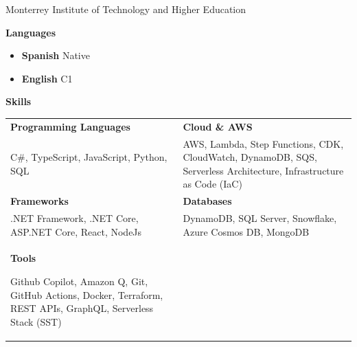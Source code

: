 \documentclass[11pt]{article}
\begin{document}
Monterrey Institute of Technology and Higher Education

\begin{center}
    \textbf{Languages}
\end{center}
\begin{itemize}[noitemsep, topsep=0pt, partopsep=0pt, parsep=0pt]
    \item \textbf{Spanish} Native
    \item \textbf{English} C1
\end{itemize}

\begin{center}
    \textbf{Skills}
\end{center}

\begin{tabular}{p{} p{}}

\textbf{Programming Languages} &
\textbf{Cloud \& AWS} \\

C\#, TypeScript, JavaScript, Python, SQL &
AWS, Lambda, Step Functions, CDK, CloudWatch, DynamoDB, SQS, Serverless Architecture, Infrastructure as Code (IaC) \\

\textbf{Frameworks} &
\textbf{Databases} \\

.NET Framework, .NET Core, ASP.NET Core, React, NodeJs &
DynamoDB, SQL Server, Snowflake, Azure Cosmos DB, MongoDB \\

\textbf{Tools}

Github Copilot, Amazon Q, Git, GitHub Actions, Docker, Terraform, REST APIs, GraphQL, Serverless Stack (SST) &

\end{tabular}
\end{document}
